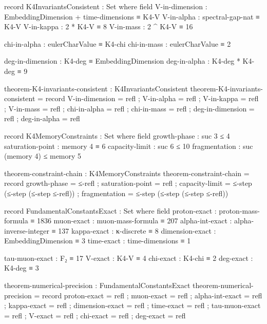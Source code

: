 \documentclass[11pt,a4paper]{book}
\begin{document}
\begin{code}
record K4InvariantsConsistent : Set where
  field
    V-in-dimension   : EmbeddingDimension + time-dimensions ≡ K4-V
    V-in-alpha       : spectral-gap-nat ≡ K4-V
    V-in-kappa       : 2 * K4-V ≡ 8
    V-in-mass        : 2 ^ K4-V ≡ 16
    
    chi-in-alpha     : eulerCharValue ≡ K4-chi
    chi-in-mass      : eulerCharValue ≡ 2
    
    deg-in-dimension : K4-deg ≡ EmbeddingDimension
    deg-in-alpha     : K4-deg * K4-deg ≡ 9

theorem-K4-invariants-consistent : K4InvariantsConsistent
theorem-K4-invariants-consistent = record
  { V-in-dimension   = refl
  ; V-in-alpha       = refl
  ; V-in-kappa       = refl
  ; V-in-mass        = refl
  ; chi-in-alpha     = refl
  ; chi-in-mass      = refl
  ; deg-in-dimension = refl
  ; deg-in-alpha     = refl
  }
\end{code}


\begin{code}
record K4MemoryConstraints : Set where
  field
    growth-phase     : suc 3 ≤ 4
    saturation-point : memory 4 ≡ 6
    capacity-limit   : suc 6 ≤ 10
    fragmentation    : suc (memory 4) ≤ memory 5

theorem-constraint-chain : K4MemoryConstraints
theorem-constraint-chain = record
  { growth-phase     = ≤-refl
  ; saturation-point = refl
  ; capacity-limit   = ≤-step (≤-step (≤-step ≤-refl))
  ; fragmentation    = ≤-step (≤-step (≤-step ≤-refl))
  }
\end{code}

\begin{code}
record FundamentalConstantsExact : Set where
  field
    proton-exact     : proton-mass-formula ≡ 1836
    muon-exact       : muon-mass-formula ≡ 207
    alpha-int-exact  : alpha-inverse-integer ≡ 137
    kappa-exact      : κ-discrete ≡ 8
    dimension-exact  : EmbeddingDimension ≡ 3
    time-exact       : time-dimensions ≡ 1
    
    tau-muon-exact   : F₂ ≡ 17
    V-exact          : K4-V ≡ 4
    chi-exact        : K4-chi ≡ 2
    deg-exact        : K4-deg ≡ 3

theorem-numerical-precision : FundamentalConstantsExact
theorem-numerical-precision = record
  { proton-exact     = refl
  ; muon-exact       = refl
  ; alpha-int-exact  = refl
  ; kappa-exact      = refl
  ; dimension-exact  = refl
  ; time-exact       = refl
  ; tau-muon-exact   = refl
  ; V-exact          = refl
  ; chi-exact        = refl
  ; deg-exact        = refl
  }
\end{code}
\end{document}

